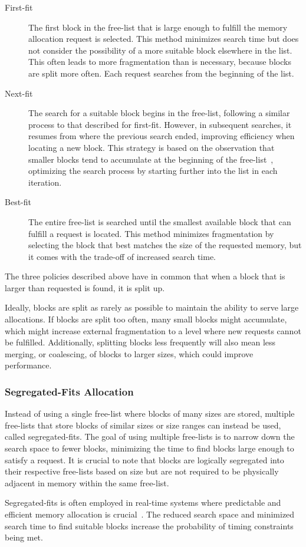 \begin{description}
    \item[First-fit]
        The first block in the free-list that is large enough to fulfill the memory allocation request is selected. This method minimizes search time but does not consider the possibility of a more suitable block elsewhere in the list. This often leads to more fragmentation than is necessary, because blocks are split more often. Each request searches from the beginning of the list.
    \item[Next-fit]
        The search for a suitable block begins in the free-list, following a similar process to that described for first-fit. However, in subsequent searches, it resumes from where the previous search ended, improving efficiency when locating a new block. This strategy is based on the observation that smaller blocks tend to accumulate at the beginning of the free-list~\cite{gchandbook}, optimizing the search process by starting further into the list in each iteration.
    \item[Best-fit]
        The entire free-list is searched until the smallest available block that can fulfill a request is located. This method minimizes fragmentation by selecting the block that best matches the size of the requested memory, but it comes with the trade-off of increased search time.
\end{description}

The three policies described above have in common that when a block that is larger than requested is found, it is split up. 

Ideally, blocks are split as rarely as possible to maintain the ability to serve large allocations. If blocks are split too often, many small blocks might accumulate, which might increase external fragmentation to a level where new requests cannot be fulfilled. Additionally, splitting blocks less frequently will also mean less merging, or coalescing, of blocks to larger sizes, which could improve performance.

\subsubsection{Segregated-Fits Allocation}

Instead of using a single free-list where blocks of many sizes are stored, multiple free-lists that store blocks of similar sizes or size ranges can instead be used, called segregated-fits. The goal of using multiple free-lists is to narrow down the search space to fewer blocks, minimizing the time to find blocks large enough to satisfy a request. It is crucial to note that blocks are logically segregated into their respective free-lists based on size but are not required to be physically adjacent in memory within the same free-list.

Segregated-fits is often employed in real-time systems where predictable and efficient memory allocation is crucial~\cite{gchandbook, TLSF}. The reduced search space and minimized search time to find suitable blocks increase the probability of timing constraints being met.

